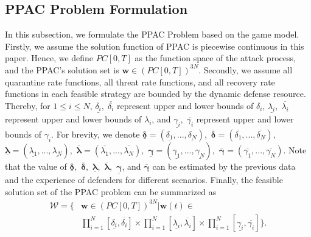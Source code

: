 \documentclass[lettersize,journal]{IEEEtran}
\begin{document}
\subsection{PPAC Problem Formulation}
In this subsection, we formulate the PPAC Problem based on the game model. Firstly, we assume the solution function of PPAC is piecewise continuous in this paper. Hence, we define $PC[0,T]$ as the function space of the attack process, and the PPAC's solution set is $\bm{w}\in (PC[0,T])^{3N}$. Secondly, we assume all quarantine rate functions, all threat rate functions, and all recovery rate functions in each feasible strategy are bounded by the dynamic defense resource. Thereby, for $1\leq i \leq N$, $\underline{\delta_i}, \; \overline{\delta_i}$ represent upper and lower bounds of $\delta_i$, $\underline{\lambda_i}, \; \overline{\lambda_i}$ represent upper and lower bounds of $\lambda_i$, and $\underline{\gamma_i}, \; \overline{\gamma_i}$ represent upper and lower bounds of $\gamma_i$. For brevity, we denote $\underline{\bm{\delta}}=(\underline{\delta_1},...,\underline{\delta_N}),$ $\overline{\bm{\delta}}=(\overline{\delta_1},...,\overline{\delta_N}),$ $\underline{\bm{\lambda}}=(\underline{\lambda_1},...,\underline{\lambda_N}),$ $\overline{\bm{\lambda}}=(\overline{\lambda_1},...,\overline{\lambda_N}),$ $\underline{\bm{\gamma}}=(\underline{\gamma_1},...,\underline{\gamma_N}),$ $\overline{\bm{\gamma}}=(\overline{\gamma_1},...,\overline{\gamma_N})$. Note that the value of $\underline{\bm{\delta}},$ $\overline{\bm{\delta}},$ $\underline{\bm{\lambda}},$ $\overline{\bm{\lambda}},$ $\underline{\bm{\gamma}}$, and $\overline{\bm{\gamma}}$ can be estimated by the previous data and the experience of defenders for different scenarios. Finally, the feasible solution set of the PPAC problem can be summarized as 
\begin{equation}\label{eq_set of PPAC}
\begin{aligned}
\mathcal{W}=\{&\bm{w}\in (PC[0,T])^{3N}|\bm{w}(t)\in \\
&\prod^N_{i=1}[\underline{\delta_i},\overline{\delta_i}]\times\prod^N_{i=1}[\underline{\lambda_i},\overline{\lambda_i}]\times\prod^N_{i=1}[\underline{\gamma_i},\overline{\gamma_i}] \}.
   \end{aligned}
\end{equation}
\par
\end{document}
